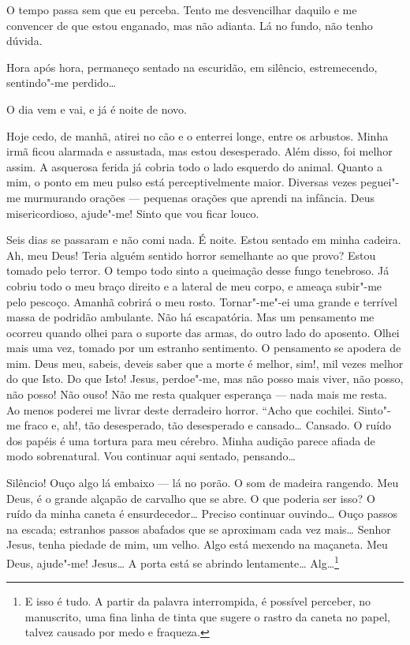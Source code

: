 O tempo passa sem que eu perceba. Tento me desvencilhar daquilo e me convencer de que estou enganado, mas não adianta.
Lá no fundo, não tenho dúvida.

Hora após hora, permaneço sentado na escuridão, em silêncio, estremecendo, sentindo"-me perdido\ldots{}

O dia vem e vai, e já é noite de novo.

Hoje cedo, de manhã, atirei no cão e o enterrei longe, entre os arbustos. Minha irmã ficou alarmada e assustada, mas
estou desesperado. Além disso, foi melhor assim. A asquerosa ferida já cobria todo o lado esquerdo do animal. Quanto a
mim, o ponto em meu pulso está perceptivelmente maior. Diversas vezes peguei"-me murmurando orações --- pequenas orações
que aprendi na infância. Deus misericordioso, ajude"-me! Sinto que vou ficar louco.

Seis dias se passaram e não comi nada. É noite. Estou sentado em minha cadeira. Ah, meu Deus! Teria alguém sentido
horror semelhante ao que provo? Estou tomado pelo terror. O tempo todo sinto a queimação desse fungo tenebroso. Já
cobriu todo o meu braço direito e a lateral de meu corpo, e ameaça subir"-me pelo pescoço. Amanhã cobrirá o meu rosto.
Tornar"-me"-ei uma grande e terrível massa de podridão ambulante. Não há escapatória. Mas um pensamento me ocorreu quando
olhei para o suporte das armas, do outro lado do aposento. Olhei mais uma vez, tomado por um estranho sentimento. O
pensamento se apodera de mim. Deus meu, sabeis, deveis saber que a morte é melhor, sim!, mil vezes melhor do que Isto.
Do que Isto! Jesus, perdoe"-me, mas não posso mais viver, não posso, não posso! Não ouso! Não me resta qualquer
esperança --- nada mais me resta. Ao menos poderei me livrar deste derradeiro horror. “Acho que cochilei. Sinto"-me fraco
e, ah!, tão desesperado, tão desesperado e cansado\ldots{} Cansado. O ruído dos papéis é uma tortura para meu cérebro. Minha
audição parece afiada de modo sobrenatural. Vou continuar aqui sentado, pensando\ldots{}

Silêncio! Ouço algo lá embaixo ---
lá no porão. O som de madeira rangendo. Meu Deus, é o grande alçapão de carvalho que se abre. O que poderia ser isso? O
ruído da minha caneta é ensurdecedor\ldots{} Preciso continuar ouvindo\ldots{} Ouço passos na escada; estranhos passos abafados
que se aproximam cada vez mais\ldots{} Senhor Jesus, tenha piedade de mim, um velho. Algo está mexendo na maçaneta. Meu
Deus, ajude"-me! Jesus\ldots{} A porta está se abrindo lentamente\ldots{} Alg\ldots{}\footnote{E isso é tudo. A partir da palavra interrompida, é possível perceber, no manuscrito, uma fina linha de tinta que sugere o rastro
da caneta no papel, talvez causado por medo e fraqueza.}



